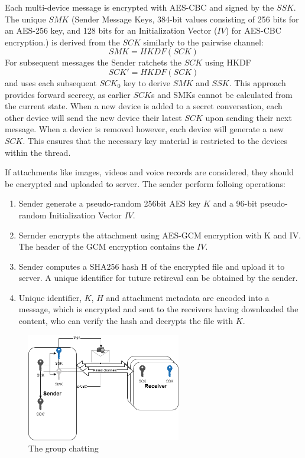 \documentclass[11pt,en]{elegantpaper}
\begin{document}
Each multi-device message is encrypted with AES-CBC and signed by the $SSK$. The unique $SMK$ (Sender Message Keys, 384-bit values consisting of 256 bits for an AES-256 key, and 128 bits for an Initialization Vector ($IV$) for AES-CBC encryption.) is derived from the $SCK$ similarly to the pairwise channel:
$$SMK=HKDF(SCK)$$
For subsequent messages the Sender ratchets the $SCK$ using HKDF
$$SCK'=HKDF(SCK)$$
and uses each subsequent $SCK_0$ key to derive $SMK$ and $SSK$. This approach provides forward secrecy, as earlier $SCK$s and SMKs cannot be calculated from the current state. When a new device is added to a secret conversation, each other device will send the new device their latest $SCK$ upon sending their next message. When a device is removed however, each device will generate a new $SCK$. This ensures that the necessary key material is restricted to the devices within the thread.

If attachments like images, videos and voice records are considered, they should be encrypted and uploaded to server. The sender perform folloing operations:
\begin{enumerate}
    \item Sender generate a pseudo-random 256bit AES key $K$ and a 96-bit pseudo-random Initialization Vector $IV$.
    \item Sernder encrypts the attachment using AES-GCM encryption with K and IV. The header of the GCM encryption contains the $IV$.
    \item Sender computes a SHA256 hash H of the encrypted file and upload it to server. A unique identifier for tuture retireval can be obtained by the sender.
    \item Unique identifier, $K$, $H$ and attachment metadata are encoded into a message, which is encrypted and sent to the receivers having downloaded the content, who can verify the hash and decrypts the file with $K$.
\end{enumerate}

\begin{figure}[H]
    \centering
    \includegraphics[width=0.6\textwidth]{image/groupchatting}
    \caption{The group chatting}
    \label{groupchatting}
\end{figure}
\end{document}
